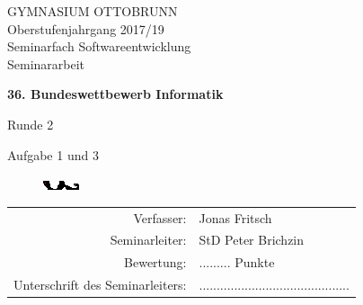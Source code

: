 \documentclass[a4paper,12pt]{article}
\begin{document}
\parindent0cm
\setlength{\abovedisplayskip}{-1cm}
\setlength{\belowdisplayskip}{0.75cm}


\thispagestyle{empty}

\begin{center}

\begin{large} 
GYMNASIUM OTTOBRUNN	\\
\vspace{1cm}
Oberstufenjahrgang 2017/19\\
\vspace{1cm}
Seminarfach Softwareentwicklung\\
\vspace{2cm}
Seminararbeit\\
\end{large}


\vspace{1cm}


{\Huge\bfseries 
36. Bundeswettbewerb Informatik\par
Runde 2\par
Aufgabe 1 und 3\par 
}

\begin{figure}[H]
    \includegraphics[width=1\linewidth]{Bilder/Sonstiges/Titelbild.png}
\end{figure}

\vspace{1cm}


\begin{large}
\begin{tabular}{rl}
Verfasser:& Jonas Fritsch \\
Seminarleiter: & StD Peter Brichzin \\
Bewertung:  & ......... Punkte  \\
Unterschrift des Seminarleiters: & ...........................................  \\
\end{tabular} 
\end{large}

\end{center}
\end{document}
